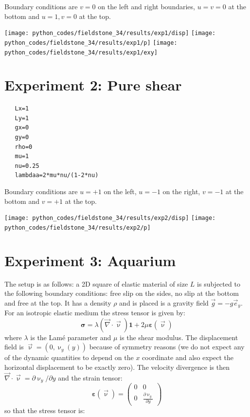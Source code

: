 Boundary conditions are $v=0$ on the left and right boundaries,
$u=v=0$ at the bottom and $u=1,v=0$ at the top.

\begin{center}
\texttt{[image: python\_codes/fieldstone\_34/results/exp1/disp]}
\texttt{[image: python\_codes/fieldstone\_34/results/exp1/p]}
\texttt{[image: python\_codes/fieldstone\_34/results/exp1/exy]}
\end{center}


\section*{Experiment 2: Pure shear }

\begin{lstlisting}
   Lx=1
   Ly=1
   gx=0
   gy=0
   rho=0
   mu=1
   nu=0.25   
   lambdaa=2*mu*nu/(1-2*nu)
\end{lstlisting}

Boundary conditions are $u=+1$ on the left, $u=-1$ on the right, 
$v=-1$ at the bottom and $v=+1$ at the top. 

\begin{center}
\texttt{[image: python\_codes/fieldstone\_34/results/exp2/disp]}
\texttt{[image: python\_codes/fieldstone\_34/results/exp2/p]}
\end{center}





\section*{Experiment 3: Aquarium}

The setup is as follows: a 2D square of elastic material of size $L$ is 
subjected to the following boundary conditions: free slip on the sides, no slip at the 
bottom and free at the top. It has a density $\rho$ and is placed is a gravity 
field ${\vec g}=-g {\vec e}_y$.
For an isotropic elastic medium the stress tensor is given by:
\[
{\bm \sigma} = \lambda ({\vec \nabla}\cdot{\vec \upnu}) {\bm 1} + 2 \mu {\bm \varepsilon}(\vec\upnu)
\]
where $\lambda$ is the Lam{\'e} parameter and $\mu$ is the shear modulus.
The displacement field is ${\vec \upnu}=(0,\upnu_y(y))$ because of symmetry reasons 
(we do not expect any of the dynamic quantities to depend on the $x$ coordinate and 
also expect the horizontal displacement to be exactly zero).
The velocity divergence is then ${\vec \nabla}\cdot{\vec \upnu} = \partial \upnu_y/\partial y$
and the strain tensor:
\[
{\bm \varepsilon}(\vec \upnu)
=
\left(
\begin{array}{cc}
0 & 0 \\
0 & \frac{\partial \upnu_y}{\partial y}
\end{array}
\right)
\]
so that the stress tensor is:

